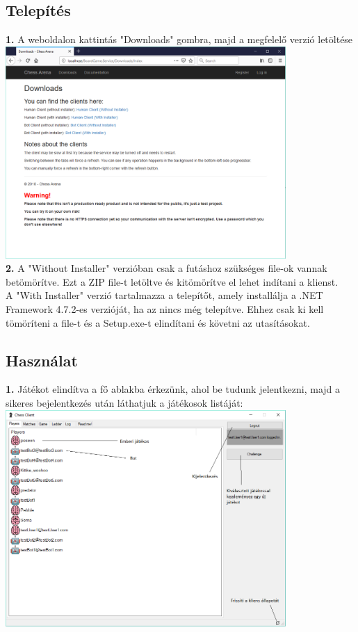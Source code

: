 \documentclass[twoside, a4paper, 12pt]{article}
\begin{document}
\subsection{Telepítés}
\noindent \textbf{1.} A weboldalon kattintás "Downloads" gombra, majd a megfelelő verzió letöltése \\
\includegraphics[width=0.8\textwidth]{img/service_downloads.png} \\
\noindent \textbf{2.} A "Without Installer" verzióban csak a futáshoz szükséges file-ok vannak betömörítve. Ezt a ZIP file-t letöltve és kitömörítve el lehet indítani a klienst. \\
A "With Installer" verzió tartalmazza a telepítőt, amely installálja a .NET Framework 4.7.2-es verzióját, ha az nincs még telepítve. Ehhez csak ki kell tömöríteni a file-t és a Setup.exe-t elindítani és követni az utasításokat.
\subsection{Használat}
\noindent \textbf{1.} Játékot elindítva a fő ablakba érkezünk, ahol be tudunk jelentkezni, majd a sikeres bejelentkezés után láthatjuk a játékosok listáját: \\
\includegraphics[width=0.8\textwidth]{img/chessClient_1.png} \\
\end{document}
